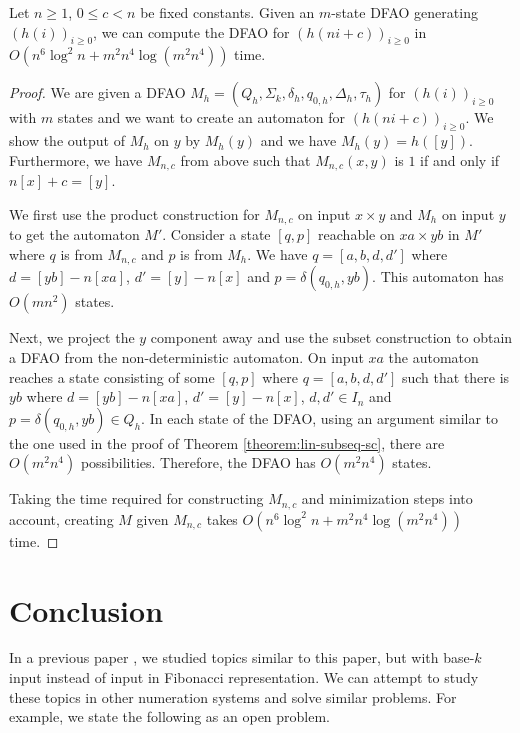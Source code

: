 \documentclass[12pt,reqno]{article}
\begin{document}
\begin{theorem} \label{theorem:h(ni+c)-time}
    Let $n \geq 1$, $0 \leq c < n$ be fixed constants. Given an $m$-state  DFAO generating $(h(i))_{i \geq 0}$, we can compute the DFAO for $(h(ni+c))_{i \geq 0}$  in $O( n^6 \log^2 n + m^2n^4 \log (m^2n^4) )$ time.
\end{theorem}

\begin{proof}
\sloppy
We are given a DFAO $M_h=(Q_h, \Sigma_k, \delta_h, q_{0,h}, \Delta_h, \tau_h)$ for $(h(i))_{i \geq 0}$ with $m$ states and we want to create an automaton for $(h(ni+c))_{i \geq0}$. We show the output of $M_h$ on $y$ by $M_h(y)$ and we have $M_h(y) = h([y])$.
Furthermore, we have $M_{n, c}$ from above such that $M_{n,c}(x, y)$ is $1$ if and only if $n[x] + c = [y]$.

We first use the product construction for $M_{n, c}$ on input $x \times y$ and $M_h$ on input $y$ to get the automaton $M'$. Consider a state $[q, p]$ reachable on $xa\times yb$ in $M'$ where $q$ is from $M_{n, c}$ and $p$ is from $M_h$. We have $q = [a, b, d, d']$ where $d=[yb]-n[xa]$, $d'=[y]-n[x]$ and $p=\delta(q_{0,h}, yb)$. This automaton has $O(mn^2)$ states.

Next, we project the $y$ component away and use the subset construction to obtain a DFAO from the non-deterministic automaton. On input $xa$ the automaton reaches a state consisting of some $[q, p]$ where $q=[a, b, d, d']$ such that there is $yb$ where $d=[yb]-n[xa]$, $d'=[y]-n[x]$,  $d, d' \in I_n$ and $p = \delta(q_{0, h}, yb) \in Q_h$. 
In each state of the DFAO, using an argument similar to the one used in the proof of Theorem \ref{theorem:lin-subseq-sc}, there are $O(m^2n^4)$ possibilities. Therefore, the DFAO has $O(m^2n^4)$ states.

Taking the time required for constructing $M_{n, c}$ and minimization steps into account, creating $M$ given $M_{n, c}$ takes $O( n^6 \log^2 n + m^2n^4\log (m^2n^4))$ time.
\end{proof}






\section{Conclusion}
In a previous paper \cite{moradi_complexity_2026}, we studied topics similar to this paper, but with base-$k$ input instead of input in Fibonacci representation. We can attempt to study these topics in other numeration systems and solve similar problems. For example, we state the following as an open problem.
\end{document}

